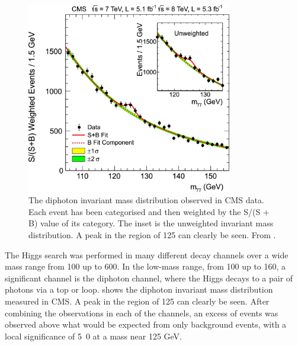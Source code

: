 \begin{figure}[htbp]
  \centering
  \includegraphics[width=0.8\textwidth]{higgs}
  \caption[The diphoton invariant mass distribution observed in CMS data.] {The
diphoton invariant mass distribution observed in CMS data.  Each event has been
categorised and then weighted by the S/(S + B) value of its category. The inset
is the unweighted invariant mass distribution. A peak in the region of
\unit{125}{\GeV} can clearly be seen. From \cite{chatrchyan2012observation}. }
  \label{fig:hgg}
\end{figure}

The Higgs search was performed in many different decay channels over a wide
mass range from 100 up to \unit{600}{\GeV}.
In the low-mass range, from 100 up to \unit{160}{\GeV}, a significant channel is the
diphoton channel, where the Higgs decays to a pair of photons via a top or \PW loop.
 shows the diphoton invariant mass distribution measured in CMS.
A peak in the region of \unit{125}{\GeV} can clearly be seen. 
After combining the observations in each of the channels, an excess of events
was observed above what would be expected from only background events, with a
local signiﬁcance of \unit{5.0}{\sigma} at a mass near 125 GeV.

